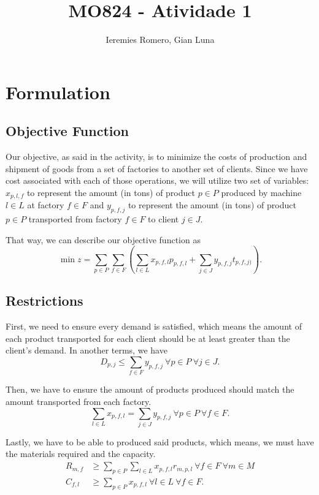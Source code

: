 \documentclass[11pt]{article}
\author{Ieremies Romero, Gian Luna}
\date{}
\title{MO824 - Atividade 1}
\theoremstyle{definition}
\theoremstyle{definition}
\theoremstyle{remark}
\theoremstyle{remark}
\theoremstyle{remark}
\theoremstyle{remark}
\theoremstyle{definition}
\begin{document}
\maketitle

\section*{Formulation}
\label{sec:orgd858f98}
\subsection*{Objective Function}
\label{sec:org9b71491}
Our objective, as said in the activity, is to minimize the costs of production and shipment of goods from a set of factories to another set of clients. Since we have cost associated with each of those operations, we will utilize two set of variables: \(x_{p,l,f}\) to represent the amount (in tons) of product \(p \in P\) produced by machine \(l \in L\) at factory \(f \in F\) and \(y_{p, f, j}\) to represent the amount (in tons) of product \(p \in P\) transported from factory \(f \in F\) to client \(j \in J\).

That way, we can describe our objective function as
\[ \min z = \sum \limits_{p \in P} \sum_{f \in F} (\sum \limits_{l \in L} x_{p,f,l}p_{p,f,l} + \sum_{j \in J} y_{p,f,j}t_{p,f,j)}). \]
\subsection*{Restrictions}
\label{sec:org8d27b20}
First, we need to ensure every demand is satisfied, which means the amount of each product transported for each client should be at least greater than the client's demand. In another terms, we have
\[ D_{p,j} \leq \sum_{f \in F} y_{p,f,j} \ \forall p \in P \ \forall j \in J. \]

Then, we have to ensure the amount of products produced should match the amount transported from each factory.
\[ \sum \limits_{l \in L} x_{p,f,l} = \sum_{j \in J} y_{p,f,j} \ \forall p \in P \ \forall f \in F . \]

Lastly, we have to be able to produced said products, which means, we must have the materials required and the capacity.
\begin{align*}
R_{m,f} &\geq \sum \limits_{p \in P} \sum \limits_{l \in L} x_{p,f,l}r_{m,p,l} \ \forall f \in F \ \forall m \in M \\
C_{f,l} &\geq \sum_{p \in P} x_{p,f,l} \ \forall l \in L \ \forall f \in F.
\end{align*}
\end{document}
